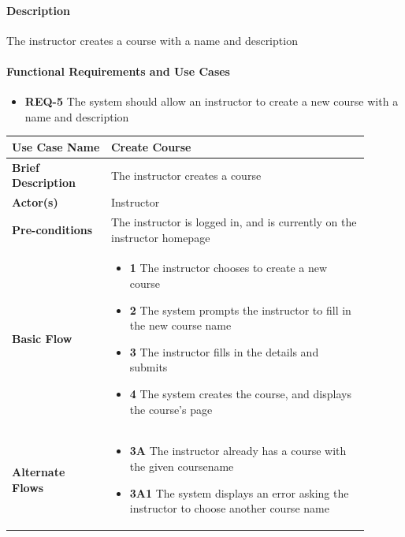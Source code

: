 \documentclass{article}
\begin{document}
\paragraph{Description} The instructor creates a course with a name and description


\paragraph{Functional Requirements and Use Cases}
\begin{itemize}
  \item \textbf{REQ-5} The system should allow an instructor to create a new course with a name and description
\end{itemize}

\vspace{0.1in}

\begin{tabular}{| p{0.25\linewidth} | p{0.65\linewidth} |}
  \hline
  \textbf{Use Case Name} & Create Course \\
  \hline
  \textbf{Brief Description} & The instructor creates a course \\
  \hline
  \textbf{Actor(s)} & Instructor \\
  \hline
  \textbf{Pre-conditions} & The instructor is logged in, and is currently on the instructor homepage\\
  \hline
  \textbf{Basic Flow} & \begin{itemize}
    \item[] \textbf{1} The instructor chooses to create a new course
    \item[] \textbf{2} The system prompts the instructor to fill in the new course name
    \item[] \textbf{3} The instructor fills in the details and submits
    \item[] \textbf{4} The system creates the course, and displays the course's page
  \end{itemize}\\
  \hline
  \textbf{Alternate Flows} & \begin{itemize}
    \item[] \textbf{3A} The instructor already has a course with the given coursename
    \item[] \textbf{3A1} The system displays an error asking the instructor to choose another course name
  \end{itemize} \\
  \hline
\end{tabular}
\end{document}
